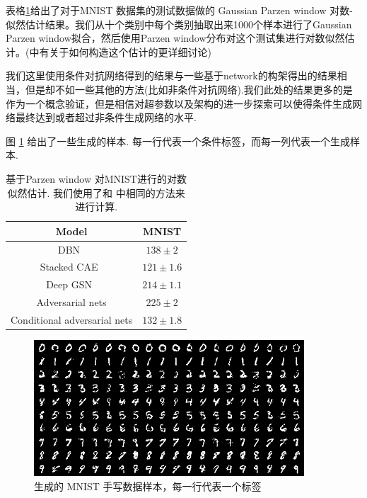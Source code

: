 \documentclass{article} %
\begin{document}
表格\ref{table:parzen}给出了对于MNIST 数据集的测试数据做的 Gaussian Parzen window 对数-似然估计结果。我们从十个类别中每个类别抽取出来1000个样本进行了Gaussian Parzen window拟合，然后使用Parzen window分布对这个测试集进行对数似然估计。(\cite{Goodfellow-et-al-NIPS2014-small}中有关于如何构造这个估计的更详细讨论)

我们这里使用条件对抗网络得到的结果与一些基于network的构架得出的结果相当，但是却不如一些其他的方法(比如非条件对抗网络).我们此处的结果更多的是作为一个概念验证，但是相信对超参数以及架构的进一步探索可以使得条件生成网络最终达到或者超过非条件生成网络的水平.

图 \ref{fig:mnist} 给出了一些生成的样本. 每一行代表一个条件标签，而每一列代表一个生成样本.

\begin{table}
	\centering
	\begin{tabular}{c|c}
	Model & MNIST  \\
	\hline
	DBN~\citep{Bengio-et-al-ICML2013} & $138 \pm 2$  \\
	Stacked CAE~\citep{Bengio-et-al-ICML2013} & $121 \pm 1.6$ \\
	Deep GSN~\citep{Bengio-et-al-ICML-2014} & $214 \pm 1.1$ \\
	Adversarial nets & $225 \pm 2$ \\
	Conditional adversarial nets & $132 \pm 1.8$
	\end{tabular}
	\caption{\small
	基于Parzen window 对MNIST进行的对数似然估计. 我们使用了和
	\cite{Goodfellow-et-al-NIPS2014-small} 中相同的方法来进行计算.}
	\label{table:parzen}
\end{table}



\begin{figure}[h]
	\centering
	    \includegraphics[width=0.9\textwidth]{mnist.png}
	    \caption{\small 生成的 MNIST 手写数据样本，每一行代表一个标签}
	\label{fig:mnist}
\end{figure}
\end{document}
